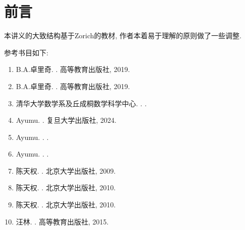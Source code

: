 \chapter*{前言}

本讲义的大致结构基于Zorich的教材, 作者本着易于理解的原则做了一些调整. 

参考书目如下: 

\begin{enumerate}

\item
B.A.卓里奇.
.
\newblock 高等教育出版社, 2019.

\item
B.A.卓里奇.
.
\newblock 高等教育出版社, 2019.

\item
清华大学数学系及丘成桐数学科学中心.
.
.

\item
Ayumu.
.
\newblock 复旦大学出版社, 2024.

\item
Ayumu.
.
.

\item
Ayumu.
.
.

\item
陈天权.
.
\newblock 北京大学出版社, 2009.

\item
陈天权.
.
\newblock 北京大学出版社, 2010.

\item
陈天权.
.
\newblock 北京大学出版社, 2010.

\item
汪林.
.
\newblock 高等教育出版社, 2015.

\end{enumerate}
